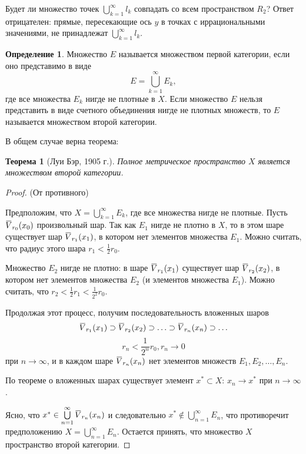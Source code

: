 \documentclass[12pt,a4paper,titlepage,oneside]{book}
\newcommand{\overbar}[1]{\mkern 1.5mu\overline{\mkern-1.5mu#1\mkern-1.5mu}\mkern 1.5mu}
\theoremstyle{definition}
\newtheorem*{definition}{Определение}
\theoremstyle{plain}
\newtheorem*{theorem}{Теорема}
\theoremstyle{break}
\theoremstyle{remark}
\theoremstyle{remark}
\theoremstyle{remark}
\theoremstyle{remark}
\theoremstyle{plain}
\theoremstyle{plain}
\begin{document}
Будет ли множество точек $\bigcup\limits_{k=1}^\infty l_k$ совпадать со всем пространством $R_2$? Ответ отрицателен: прямые, пересекающие ось $y$ в точках с иррациональными значениями, не принадлежат $\bigcup\limits_{k=1}^\infty l_k$.

\begin{definition}
Множество $E$ называется множеством первой категории, если оно представимо в виде 
$$E=\bigcup\limits_{k=1}^\infty E_k,$$ 
где все множества $E_k$ нигде не плотные в $X$. Если множество $E$ нельзя представить в виде счетного объединения нигде не плотных множеств, то $E$ называется множеством второй категории.
\end{definition}

В общем случае верна теорема:

\begin{theorem}[Луи Бэр, 1905 г.]
Полное метрическое пространство $X$ является множеством второй категории.
\end{theorem}

\begin{proof}
(От противного)

Предположим, что $X=\bigcup\limits_{k=1}^\infty E_k$, где все множества нигде не плотные. Пусть $\overbar{V}_{r_0}(x_0)$ произвольный шар. Так как $E_1$ нигде не плотно в $X$, то в этом шаре существует шар $\overbar{V}_{r_1}(x_1)$, в котором нет элементов множества $E_1$. Можно считать, что радиус этого шара $r_1 < \frac{1}{2}r_0$.

Множество $E_2$ нигде не плотно: в шаре $\overbar{V}_{r_1}(x_1)$ существует шар $\overbar{V}_{r_2}(x_2)$, в котором нет элементов множества $E_2$ (и элементов множества $E_1$). Можно считать, что $r_2 < \frac{1}{2}r_1 < \frac{1}{2^2}r_0$.

Продолжая этот процесс, получим последовательность вложенных шаров 
$$\overbar{V}_{r_1}(x_1) \supset \overbar{V}_{r_2}(x_2) \supset \ldots \supset \overbar{V}_{r_n}(x_n) \supset \ldots$$
$$r_n < \frac{1}{2^n}r_0, r_n \to 0$$
при
$n \to \infty$, и в каждом шаре $\overbar{V}_{r_n}(x_n)$ нет элементов множеств $E_1, E_2, \ldots, E_n$.

По теореме о вложенных шарах существует элемент $x^*\subset X$:
$x_n \to x^*$ при $n \to \infty$.

Ясно, что $x^*\in \bigcup\limits_{n=1}^\infty \overbar{V}_{r_n}(x_n)$ и следовательно $x^*\notin \bigcup\limits_{n=1}^\infty E_n$, что противоречит предположению $X=\bigcup\limits_{n=1}^\infty E_n$. Остается принять, что множество $X$ пространство второй категории.
\end{proof}
\end{document}
